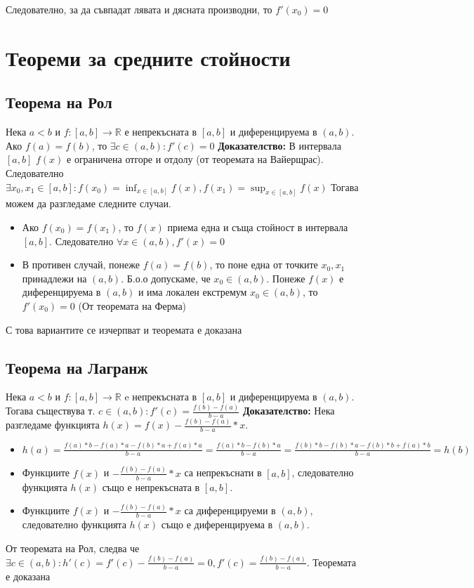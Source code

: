 \documentclass[fleqn,12pt]{article}
\begin{document}
\begin{flushleft}
Следователно, за да съвпадат лявата и дясната производни, то $f'(x_0) = 0$

\section{Теореми  за  средните  стойности}
\subsection{Теорема на Рол}
Нека $a<b$ и $f:[a,b]\rightarrow\mathbb{R}$ е непрекъсната в $[a,b]$ и диференцируема в $(a,b)$. Ако $f(a) = f(b)$, то $\exists c \in (a,b): f'(c)=0$
\bigbreak
\textbf{Доказателство:}
В интервала $[a,b]$ $f(x)$ е ограничена отгоре и отдолу (от теоремата на Вайерщрас).
Следователно $\exists x_0,x_1 \in [a,b]: f(x_0)=\inf_{x \in [a,b]} f(x), f(x_1)=\sup_{x \in [a,b]} f(x)$
Тогава можем да разгледаме следните случаи.
\begin{itemize}
    \item Ако $f(x_0) = f(x_1)$, то $f(x)$ приема една и съща стойност в интервала $[a,b]$. Следователно $\forall x \in (a,b), f'(x)=0$ 

    \item В противен случай, понеже $f(a) = f(b)$, то поне една от точките $x_0,x_1$ принадлежи на $(a,b)$. Б.о.о допускаме, че $x_0 \in (a,b)$. Понеже $f(x)$ е диференцируема в $(a,b)$ и има локален екстремум $x_0 \in (a,b)$, то $f'(x_0) = 0$ (От теоремата на Ферма) 
\end{itemize}
С това вариантите се изчерпват и теоремата е доказана

\subsection{Теорема на Лагранж}
Нека $a<b$ и $f:[a,b]\rightarrow\mathbb{R}$ e непрекъсната в $[a,b]$ и диференцируема в $(a,b)$.
Тогава съществува т. $c \in (a,b): f'(c) = \frac{f(b)-f(a)}{b-a}$
\bigbreak
\textbf{Доказателство:}
Нека разгледаме функцията $h(x)=f(x) - \frac{f(b)-f(a)}{b-a}*x$. 
\begin{itemize}
    \item $h(a)=\frac{f(a)*b - f(a)*a - f(b)*a + f(a)*a}{b-a} = \frac{f(a)*b-f(b)*a}{b-a} = \frac{f(b)*b - f(b)*a - f(b)*b + f(a)*b}{b-a} = h(b)$
    \item Функциите $f(x)$ и $-\frac{f(b)-f(a)}{b-a}*x$ са непрекъснати в $[a,b]$, следователно функцията $h(x)$ също е непрекъсната в $[a,b]$.
    \item Функциите $f(x)$ и $-\frac{f(b)-f(a)}{b-a}*x$ са диференцируеми в $(a,b)$, следователно функцията $h(x)$ също е диференцируема в $(a,b)$.
\end{itemize}
От теоремата на Рол, следва че $\exists c \in (a,b): h'(c) = f'(c) - \frac{f(b)-f(a)}{b-a} = 0, f'(c) = \frac{f(b)-f(a)}{b-a}$.
Теоремата е доказана


\end{flushleft}
\end{document}
